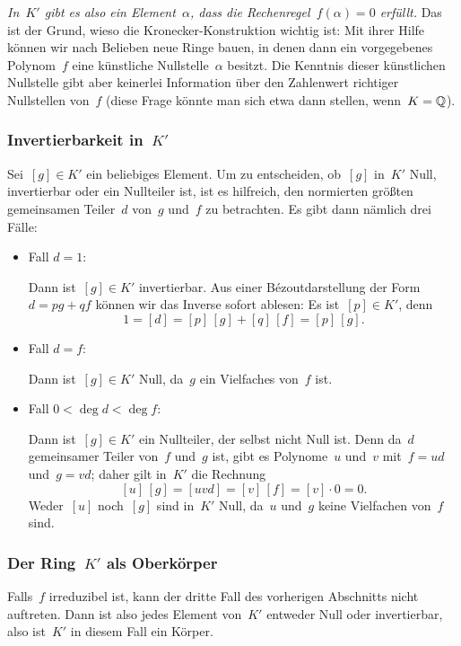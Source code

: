 \documentclass{../../alg2/algblatt}
\begin{document}
\emph{In~$K'$ gibt es also ein Element~$\alpha$, dass die
Rechenregel~$f(\alpha) = 0$ erfüllt.} Das ist der Grund, wieso die
Kronecker-Konstruktion wichtig ist: Mit ihrer Hilfe können wir
nach Belieben neue Ringe bauen, in denen dann ein vorgegebenes Polynom~$f$ eine
künstliche Nullstelle~$\alpha$ besitzt. Die Kenntnis dieser künstlichen
Nullstelle gibt aber keinerlei Information über den Zahlenwert richtiger
Nullstellen von~$f$ (diese Frage könnte man sich etwa dann stellen, wenn~$K =
\mathbb{Q}$).


\subsubsection*{Invertierbarkeit in~$K'$}

Sei~$[g] \in K'$ ein beliebiges Element. Um zu entscheiden, ob~$[g]$ in~$K'$
Null, invertierbar oder ein Nullteiler ist, ist es hilfreich, den normierten
größten gemeinsamen Teiler~$d$ von~$g$ und~$f$ zu betrachten. Es gibt dann
nämlich drei Fälle:
\begin{itemize}
\item Fall $d = 1$:

Dann ist~$[g] \in K'$ invertierbar. Aus einer
Bézoutdarstellung der Form~$d = pg + qf$ können wir das Inverse sofort ablesen:
Es ist~$[p] \in K'$, denn
\[ 1 = [d] = [p]\,[g] + [q]\,[f] = [p]\,[g]. \]

\item Fall $d = f$:

Dann ist~$[g] \in K'$ Null, da~$g$ ein Vielfaches von~$f$
ist.

\item Fall $0 < \deg d < \deg f$:

Dann ist~$[g] \in K'$ ein Nullteiler, der
selbst nicht Null ist. Denn da~$d$ gemeinsamer Teiler von~$f$ und~$g$ ist, gibt
es Polynome~$u$ und~$v$ mit~$f = ud$ und~$g = vd$; daher gilt in~$K'$ die
Rechnung
\[ [u]\,[g] = [uvd] = [v]\,[f] = [v]\cdot0 = 0. \]
Weder~$[u]$ noch~$[g]$ sind in~$K'$ Null, da~$u$ und~$g$ keine Vielfachen
von~$f$ sind.
\end{itemize}


\subsubsection*{Der Ring~$K'$ als Oberkörper}

Falls~$f$ irreduzibel ist, kann der dritte Fall des vorherigen Abschnitts nicht
auftreten. Dann ist also jedes Element von~$K'$ entweder Null oder
invertierbar, also ist~$K'$ in diesem Fall ein Körper.
\end{document}
